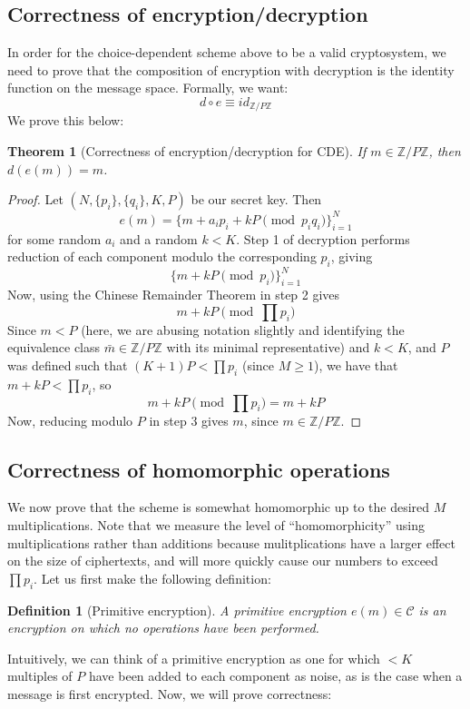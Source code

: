 \documentclass[11pt]{report}
\newtheorem{thm}{Theorem}
\newtheorem{definition}{Definition}
\newcommand{\ZP}{\mathbb{Z}/P\mathbb{Z}}
\begin{document}
\subsection{Correctness of encryption/decryption}

In order for the choice-dependent scheme above to be a valid cryptosystem, we need to prove that the composition of encryption with decryption is the identity function on the message space. Formally, we want: \[d\circ e \equiv id_{\ZP}\] We prove this below:

\begin{thm}[Correctness of encryption/decryption for CDE]
If $m\in\ZP$, then $d(e(m)) = m$.
\end{thm}

\begin{proof}
Let $(N,\{p_i\},\{q_i\},K,P)$ be our secret key. Then
\[e(m) = \{m+a_ip_i+kP \pmod{p_iq_i}\}_{i=1}^N\]
for some random $a_i$ and a random $k<K$. Step 1 of decryption performs reduction of each component modulo the corresponding $p_i$, giving
\[\{m+kP \pmod{p_i}\}_{i=1}^N \]
Now, using the Chinese Remainder Theorem in step 2 gives
\[ m+kP \pmod{\prod p_i} \]
Since $m<P$ (here, we are abusing notation slightly and identifying the equivalence class $\bar{m} \in \ZP$ with its minimal representative) and $k<K$, and $P$ was defined such that $(K+1)P <\prod p_i$ (since $M\geq 1$), we have that $m+kP <\prod p_i$, so
\[ m+kP \pmod{\prod p_i} = m+kP\]
Now, reducing modulo $P$ in step 3 gives $m$, since $m\in \ZP$.
\end{proof}


\subsection{Correctness of homomorphic operations}

We now prove that the scheme is somewhat homomorphic up to the desired $M$ multiplications. Note that we measure the level of ``homomorphicity'' using multiplications rather than additions because mulitplications have a larger effect on the size of ciphertexts, and will more quickly cause our numbers to exceed $\prod p_i$. Let us first make the following definition:

\begin{definition}[Primitive encryption]
A \emph{primitive encryption} $e(m) \in \mathcal{C}$ is an encryption on which no operations have been performed.
\end{definition}

Intuitively, we can think of a primitive encryption as one for which $<K$ multiples of $P$ have been added to each component as noise, as is the case when a message is first encrypted. Now, we will prove correctness:
\end{document}
